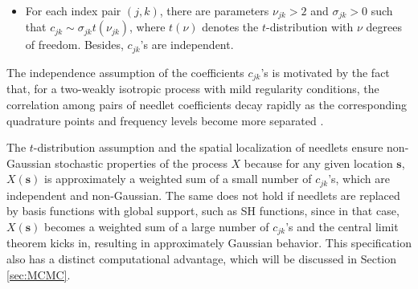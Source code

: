 \documentclass[aoas,preprint]{imsart}
\numberwithin{equation}{section}
\theoremstyle{plain}
\begin{document}
\begin{itemize}
\item
For each index pair $(j,k)$, there are parameters $\nu_{jk} > 2$ and $\sigma_{jk} > 0$ such that $c_{jk}
\sim \sigma_{jk} t(\nu_{jk})$, where $t(\nu)$ denotes the $t$-distribution with $\nu$
degrees of freedom. Besides, $c_{jk}$'s are independent.
\end{itemize}
The independence assumption of the coefficients $c_{jk}$'s is motivated by the fact 
that, for a two-weakly isotropic process with mild regularity conditions,
the correlation among pairs of needlet coefficients decay rapidly as the corresponding quadrature points and frequency levels become more separated \citep{Baldi-09, Marinucci2011}.

The $t$-distribution assumption and the spatial localization of needlets ensure non-Gaussian stochastic properties of the process $X$ because for any given location $\mathbf{s}$, $X(\mathbf{s})$ is approximately a weighted sum of a small number of $c_{jk}$'s, which are independent and non-Gaussian.
The same does not hold if needlets are replaced by basis functions with global support, such as SH functions, since in that case, $X(\mathbf{s})$ becomes a weighted sum of a large number of $c_{jk}$'s and the central limit theorem kicks in, resulting in approximately Gaussian behavior. This specification also has a distinct computational advantage, which will be discussed in Section \ref{sec:MCMC}. 
\end{document}
